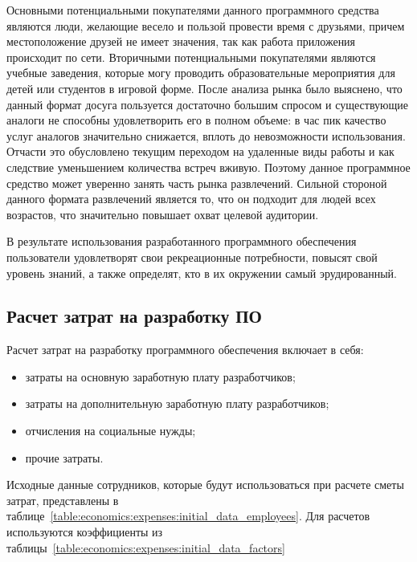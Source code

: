 Основными потенциальными покупателями данного программного средства являются люди, желающие весело и пользой провести время с друзьями, причем местоположение друзей не имеет значения, так как работа
приложения происходит по сети. Вторичными потенциальными покупателями являются учебные заведения, которые могу проводить образовательные мероприятия для детей или студентов в игровой форме.
После анализа рынка было выяснено, что данный формат досуга пользуется достаточно большим спросом и существующие аналоги не способны удовлетворить его в полном объеме: в час пик качество услуг аналогов
значительно снижается, вплоть до невозможности использования. Отчасти это обусловлено текущим переходом на удаленные виды работы и как следствие уменьшением количества встреч вживую. Поэтому данное 
программное средство может уверенно занять часть рынка развлечений. Сильной стороной данного формата развлечений является то, что он подходит для людей всех возрастов, что значительно
повышает охват целевой аудитории.

В результате использования разработанного программного обеспечения пользователи удовлетворят свои рекреационные потребности, повысят свой уровень знаний, а также определят, кто 
в их окружении самый эрудированный.

\subsection{Расчет затрат на разработку ПО}
\label{sec:economics:expenses}

Расчет затрат на разработку программного обеспечения включает в себя:
\begin{itemize}
    \item затраты на основную заработную плату разработчиков;
    \item затраты на дополнительную заработную плату разработчиков;
    \item отчисления на социальные нужды;
    \item прочие затраты.
\end{itemize}

Исходные данные сотрудников, которые будут использоваться при расчете сметы затрат, представлены в таблице~\ref{table:economics:expenses:initial_data_employees}.
Для расчетов используются коэффициенты из таблицы~\ref{table:economics:expenses:initial_data_factors}

